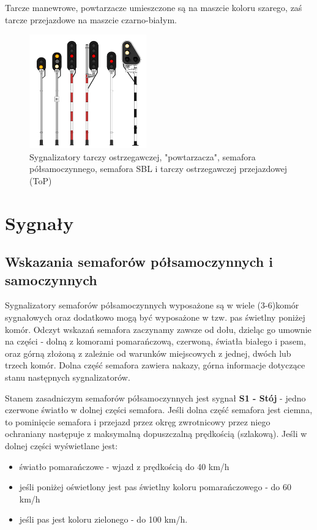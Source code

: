 Tarcze manewrowe, powtarzacze umieszczone są na maszcie koloru szarego, zaś tarcze przejazdowe na maszcie czarno-białym.

	\begin{figure}
		\includegraphics[width=0.45\textwidth]{skryptkierownik-img/sygnalizatory.png}
		\caption{Sygnalizatory tarczy ostrzegawczej, "powtarzacza", semafora półsamoczynnego, semafora SBL i tarczy ostrzegawczej przejazdowej (ToP)}
		\label{fig:sygnalizatory}
	\end{figure}
	
\section{Sygnały}
\subsection{Wskazania semaforów półsamoczynnych i samoczynnych}
Sygnalizatory semaforów półsamoczynnych wyposażone są w wiele (3-6)komór sygnałowych oraz dodatkowo mogą być wyposażone w tzw. pas świetlny poniżej komór. Odczyt wskazań semafora zaczynamy zawsze od dołu, dzieląc go umownie na części - dolną z komorami pomarańczową, czerwoną, światła białego i pasem, oraz górną złożoną z zależnie od warunków miejscowych z jednej, dwóch lub trzech komór. Dolna część semafora zawiera nakazy, górna informacje dotyczące stanu następnych sygnalizatorów.

Stanem zasadniczym semaforów półsamoczynnych jest sygnał \textbf{S1 - Stój} - jedno czerwone światło w dolnej części semafora. 
Jeśli dolna część semafora jest ciemna, to pominięcie semafora i przejazd przez okręg zwrotnicowy przez niego ochraniany następuje z maksymalną dopuszczalną prędkością (szlakową). 
Jeśli w dolnej części wyświetlane jest:
\begin{itemize}
	\item światło pomarańczowe - wjazd z prędkością do 40 km/h
	\item jeśli poniżej oświetlony jest pas świetlny koloru pomarańczowego - do 60 km/h
	\item jeśli pas jest koloru zielonego - do 100 km/h.
\end{itemize}

